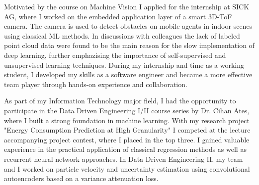     Motivated by the course on Machine Vision I applied for the internship at SICK AG, where I worked on the embedded application layer of a smart 3D-ToF camera. The camera is used to detect obstacles on mobile agents in indoor scenes using classical ML methods. In discussions with colleagues the lack of labeled point cloud data were found to be the main reason for the slow implementation of deep learning, further emphazising the importance of self-supervised and unsupervised learning techniques. During my internship and time as a working student, I developed my skills as a software engineer and became a more effective team player through hands-on experience and collaboration.

    As part of my Information Technology major field, I had the opportunity to participate in the Data Driven Engineering I/II course series by Dr. Cihan Ates, where I built a strong foundation in machine learning. With my research project "Energy Consumption Prediction at High Granularity" I competed at the lecture accompanying project contest, where I placed in the top three. I gained valuable experience in the practical application of classical regression methods as well as recurrent neural network approaches. In Data Driven Engineering II, my team and I worked on particle velocity and uncertainty estimation using convolutional autoencoders based on a variance attenuation loss. 



